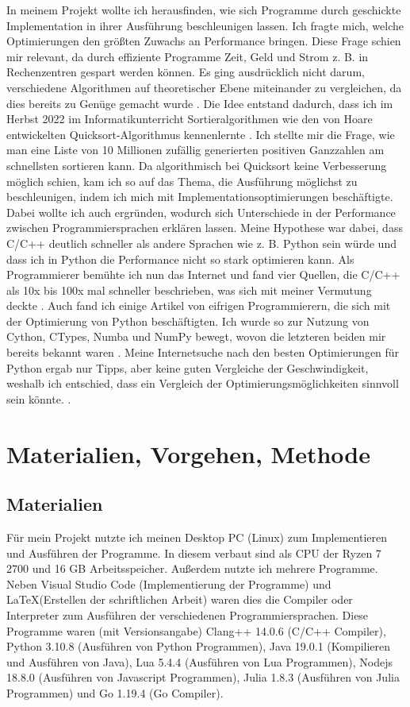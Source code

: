 \documentclass[11pt,a4paper]{article}
\begin{document}
In meinem Projekt wollte ich herausfinden, wie sich Programme durch geschickte Implementation
in ihrer Ausführung beschleunigen lassen. Ich fragte mich, welche Optimierungen den größten Zuwachs
an Performance bringen. Diese Frage schien mir relevant, da durch effiziente Programme Zeit, Geld
und Strom z. B. in Rechenzentren gespart werden können.
Es ging ausdrücklich nicht darum, verschiedene Algorithmen auf theoretischer Ebene
miteinander zu vergleichen, da dies bereits zu Genüge gemacht wurde \cite{sortieralgorithmenwikipedia}.
Die Idee entstand dadurch, dass ich im Herbst 2022 im Informatikunterricht
Sortieralgorithmen wie den von Hoare entwickelten Quicksort-Algorithmus kennenlernte \cite{quicksortwikipedia}.
Ich stellte mir die Frage, wie man eine Liste von 10 Millionen zufällig generierten positiven Ganzzahlen
am schnellsten sortieren kann. Da algorithmisch bei Quicksort keine Verbesserung möglich schien,
kam ich so auf das Thema, die Ausführung möglichst zu beschleunigen, indem ich mich mit
Implementationsoptimierungen beschäftigte. Dabei wollte ich auch ergründen, wodurch sich Unterschiede
in der Performance zwischen Programmiersprachen erklären lassen. Meine Hypothese war dabei,
dass C/C++ deutlich schneller als andere Sprachen wie z. B. Python sein würde und dass
ich in Python die Performance nicht so stark optimieren kann.  Als Programmierer bemühte ich
nun das Internet und fand vier Quellen, die C/C++ als 10x bis 100x mal schneller beschrieben,
was sich mit meiner Vermutung deckte \cite{pyengineeringvscpp} \cite{quorepythonvscpp}
\cite{stopythonvscpp}.
Auch fand ich einige Artikel von eifrigen Programmierern, die sich mit der Optimierung
von Python beschäftigten. Ich wurde so zur Nutzung von Cython, CTypes, Numba und NumPy bewegt,
wovon die letzteren beiden mir bereits bekannt waren \cite{cythonctypes}.
Meine Internetsuche nach den besten Optimierungen für Python ergab nur Tipps, aber keine
guten Vergleiche der Geschwindigkeit, weshalb ich entschied, dass ein Vergleich der
Optimierungsmöglichkeiten sinnvoll sein könnte.
\cite{pythonopt1} \cite{pythonopt2} \cite{pythonopt3}.

\section{Materialien, Vorgehen, Methode}

\subsection{Materialien}
Für mein Projekt nutzte ich meinen Desktop PC (Linux) zum Implementieren und Ausführen der Programme.
In diesem verbaut sind als CPU der Ryzen 7 2700 und 16 GB Arbeitsspeicher. Außerdem nutzte ich mehrere Programme.
Neben Visual Studio Code (Implementierung der Programme) und \LaTeX (Erstellen der schriftlichen Arbeit)
waren dies die Compiler oder Interpreter zum Ausführen der verschiedenen Programmiersprachen.
Diese Programme waren (mit Versionsangabe) Clang++ 14.0.6 (C/C++ Compiler), Python 3.10.8 (Ausführen von Python Programmen),
Java 19.0.1 (Kompilieren und Ausführen von Java), Lua 5.4.4 (Ausführen von Lua Programmen),
Nodejs 18.8.0 (Ausführen von Javascript Programmen), Julia 1.8.3 (Ausführen von Julia Programmen)
und Go 1.19.4 (Go Compiler).
\end{document}
